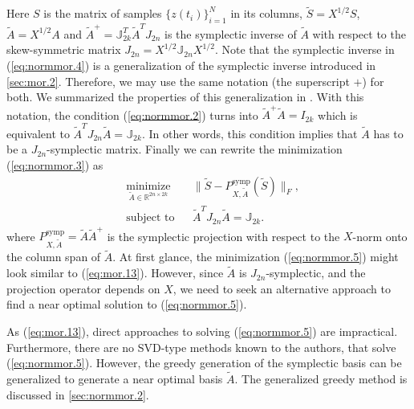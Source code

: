 Here $S$ is the matrix of samples $\{ z(t_i) \}_{i=1}^{N}$ in its columns, $\tilde S = X^{1/2} S$, $\tilde A = X^{1/2} A$ and $\tilde A^+ = \mathbb J_{2k}^T \tilde A^T J_{2n}$ is the symplectic inverse of $\tilde A$ with respect to the skew-symmetric matrix $J_{2n} = X^{1/2} \mathbb J_{2n} X^{1/2}$. Note that the symplectic inverse in (\ref{eq:normmor.4}) is a generalization of the symplectic inverse introduced in \cref{sec:mor.2}. Therefore, we may use the same notation (the superscript $+$) for both. We summarized the properties of this generalization in . With this notation, the condition (\ref{eq:normmor.2}) turns into $\tilde A ^+ \tilde A = I_{2k}$ which is equivalent to $\tilde A ^T J_{2n} \tilde A = \mathbb J_{2k}$. In other words, this condition implies that $\tilde A$ has to be a $J_{2n}$-symplectic matrix. Finally we can rewrite the minimization (\ref{eq:normmor.3}) as
\begin{equation} \label{eq:normmor.5}
\begin{aligned}
& \underset{\tilde A\in \mathbb{R}^{2n\times 2k}}{\text{minimize}}
& & \| \tilde S - P^\text{symp}_{X,\tilde A}(\tilde S) \|_F, \\
& \text{subject to}
& & \tilde A^T J_{2n} \tilde A = \mathbb J_{2k}.
\end{aligned}
\end{equation}
where $P^\text{symp}_{X,\tilde A} = \tilde A \tilde A^+$ is the symplectic projection with respect to the $X$-norm onto the column span of $\tilde A$. At first glance, the minimization (\ref{eq:normmor.5}) might look similar to (\ref{eq:mor.13}). However, since $\tilde A$ is $J_{2n}$-symplectic, and the projection operator depends on $X$, we need to seek an alternative approach to find a near optimal solution to (\ref{eq:normmor.5}). 

As (\ref{eq:mor.13}), direct approaches to solving (\ref{eq:normmor.5}) are impractical. Furthermore, there are no SVD-type methods known to the authors, that solve (\ref{eq:normmor.5}). However, the greedy generation of the symplectic basis can be generalized to generate a near optimal basis $\tilde A$. The generalized greedy method is discussed in \cref{sec:normmor.2}.

